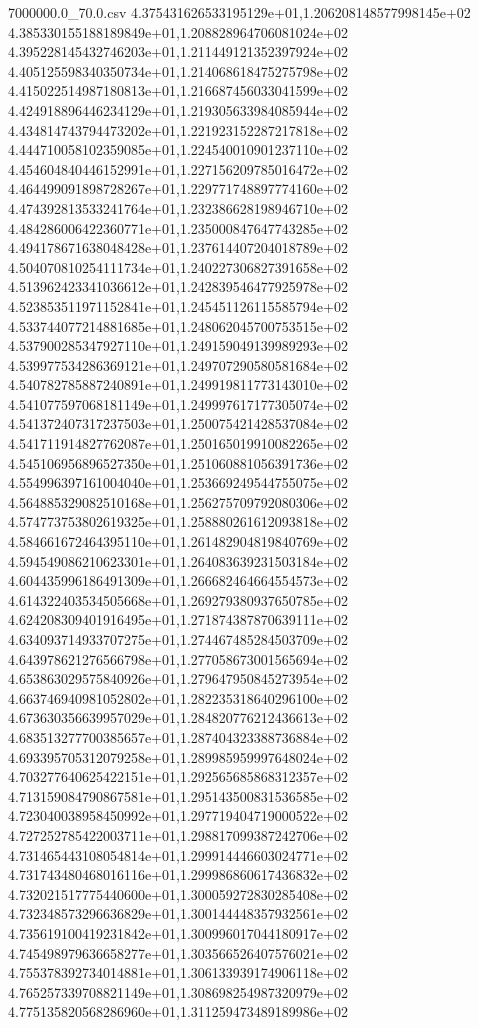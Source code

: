 \begin{filecontents*}{7000000.0_70.0.csv}
4.375431626533195129e+01,1.206208148577998145e+02
4.385330155188189849e+01,1.208828964706081024e+02
4.395228145432746203e+01,1.211449121352397924e+02
4.405125598340350734e+01,1.214068618475275798e+02
4.415022514987180813e+01,1.216687456033041599e+02
4.424918896446234129e+01,1.219305633984085944e+02
4.434814743794473202e+01,1.221923152287217818e+02
4.444710058102359085e+01,1.224540010901237110e+02
4.454604840446152991e+01,1.227156209785016472e+02
4.464499091898728267e+01,1.229771748897774160e+02
4.474392813533241764e+01,1.232386628198946710e+02
4.484286006422360771e+01,1.235000847647743285e+02
4.494178671638048428e+01,1.237614407204018789e+02
4.504070810254111734e+01,1.240227306827391658e+02
4.513962423341036612e+01,1.242839546477925978e+02
4.523853511971152841e+01,1.245451126115585794e+02
4.533744077214881685e+01,1.248062045700753515e+02
4.537900285347927110e+01,1.249159049139989293e+02
4.539977534286369121e+01,1.249707290580581684e+02
4.540782785887240891e+01,1.249919811773143010e+02
4.541077597068181149e+01,1.249997617177305074e+02
4.541372407317237503e+01,1.250075421428537084e+02
4.541711914827762087e+01,1.250165019910082265e+02
4.545106956896527350e+01,1.251060881056391736e+02
4.554996397161004040e+01,1.253669249544755075e+02
4.564885329082510168e+01,1.256275709792080306e+02
4.574773753802619325e+01,1.258880261612093818e+02
4.584661672464395110e+01,1.261482904819840769e+02
4.594549086210623301e+01,1.264083639231503184e+02
4.604435996186491309e+01,1.266682464664554573e+02
4.614322403534505668e+01,1.269279380937650785e+02
4.624208309401916495e+01,1.271874387870639111e+02
4.634093714933707275e+01,1.274467485284503709e+02
4.643978621276566798e+01,1.277058673001565694e+02
4.653863029575840926e+01,1.279647950845273954e+02
4.663746940981052802e+01,1.282235318640296100e+02
4.673630356639957029e+01,1.284820776212436613e+02
4.683513277700385657e+01,1.287404323388736884e+02
4.693395705312079258e+01,1.289985959997648024e+02
4.703277640625422151e+01,1.292565685868312357e+02
4.713159084790867581e+01,1.295143500831536585e+02
4.723040038958450992e+01,1.297719404719000522e+02
4.727252785422003711e+01,1.298817099387242706e+02
4.731465443108054814e+01,1.299914446603024771e+02
4.731743480468016116e+01,1.299986860617436832e+02
4.732021517775440600e+01,1.300059272830285408e+02
4.732348573296636829e+01,1.300144448357932561e+02
4.735619100419231842e+01,1.300996017044180917e+02
4.745498979636658277e+01,1.303566526407576021e+02
4.755378392734014881e+01,1.306133939174906118e+02
4.765257339708821149e+01,1.308698254987320979e+02
4.775135820568286960e+01,1.311259473489189986e+02

\end{filecontents*}

